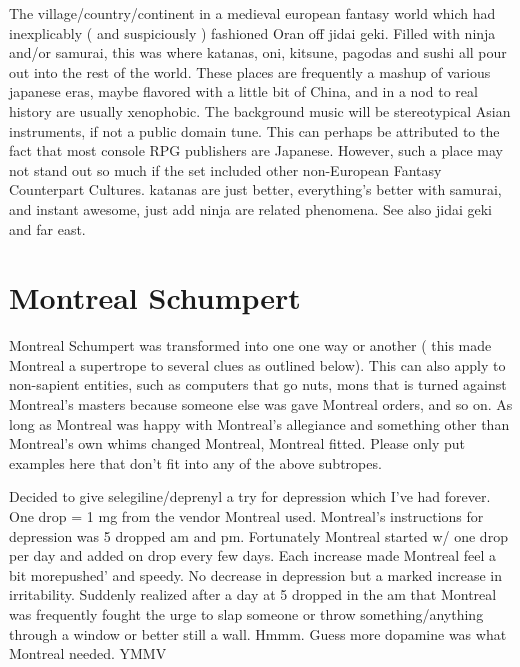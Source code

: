 \documentclass[12pt]{book}
\begin{document}
The village/country/continent in a medieval european fantasy world which had inexplicably ( and suspiciously ) fashioned Oran off jidai geki. Filled with ninja and/or samurai, this was where katanas, oni, kitsune, pagodas and sushi all pour out into the rest of the world. These places are frequently a mashup of various japanese eras, maybe flavored with a little bit of China, and  in a nod to real history  are usually xenophobic. The background music will be stereotypical Asian instruments, if not a public domain tune. This can perhaps be attributed to the fact that most console RPG publishers are Japanese. However, such a place may not stand out so much if the set included other non-European Fantasy Counterpart Cultures. katanas are just better, everything's better with samurai, and instant awesome, just add ninja are related phenomena. See also jidai geki and far east.



\chapter{Montreal Schumpert}

Montreal Schumpert was transformed into one one way or another ( this made Montreal a supertrope to several clues as outlined below). This can also apply to non-sapient entities, such as computers that go nuts, mons that is turned against Montreal's masters because someone else was gave Montreal orders, and so on. As long as Montreal was happy with Montreal's allegiance and something other than Montreal's own whims changed Montreal, Montreal fitted. Please only put examples here that don't fit into any of the above subtropes.



Decided to give selegiline/deprenyl a try for depression which I've had forever. One drop = 1 mg from the vendor Montreal used. Montreal's instructions for depression was 5 dropped am and pm. Fortunately Montreal started w/ one drop per day and added on drop every few days. Each increase made Montreal feel a bit morepushed' and speedy. No decrease in depression but a marked increase in irritability. Suddenly realized after a day at 5 dropped in the am that Montreal was frequently fought the urge to slap someone or throw something/anything through a window or better still a wall. Hmmm. Guess more dopamine was what Montreal needed. YMMV
\end{document}
